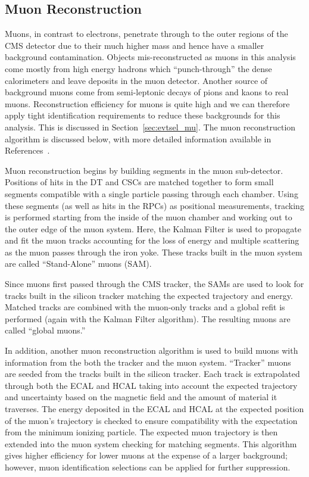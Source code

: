\subsection{Muon Reconstruction}
\label {sec:cms_muon}
Muons, in contrast to electrons, penetrate through to the outer regions of
the CMS detector due to their much higher mass and hence have a smaller
background contamination. Objects mis-reconstructed as muons in this
analysis come mostly from high energy hadrons which ``punch-through'' the
dense calorimeters and leave deposits in the muon detector. Another source
of background muons come from semi-leptonic decays of pions and kaons to
real muons. Reconstruction efficiency for muons is quite high and we can
therefore apply tight identification requirements to reduce these backgrounds
for this analysis. This is discussed in Section~\ref{sec:evtsel_mu}. The muon
reconstruction algorithm is discussed below, with more detailed information
available in References~\cite{muontdr,muonReco}.

Muon reconstruction begins by building segments in the muon sub-detector.
Positions of hits in the DT and CSCs are matched together to form small
segments compatible with a single particle passing through each chamber. Using
these segments (as well as hits in the RPCs) as positional measurements,
tracking is performed starting from the inside of the muon chamber and working
out to the outer edge of the muon system. Here, the Kalman Filter is used
to propagate and fit the muon tracks accounting for the loss of energy and
multiple scattering as the muon passes through the iron yoke. These tracks
built in the muon system are called ``Stand-Alone'' muons (SAM).

Since muons first passed through the CMS tracker, the SAMs are used to look
for tracks built in the silicon tracker matching the expected trajectory and
energy. Matched tracks are combined with the muon-only tracks and a global
refit is performed (again with the Kalman Filter algorithm). The resulting
muons are called ``global muons.''

In addition, another muon reconstruction algorithm is used to build muons
with information from the both the tracker and the muon system. ``Tracker''
muons are seeded from the tracks built in the silicon tracker. Each track is
extrapolated through both the ECAL and HCAL taking into account the expected
trajectory and uncertainty based on the magnetic field and the amount of
material it traverses. The energy deposited in the ECAL and HCAL at the expected
position of the muon's trajectory is checked to ensure compatibility with the
expectation from the minimum ionizing particle. The expected muon trajectory
is then extended into the muon system checking for matching segments. This
algorithm gives higher efficiency for lower \pt muons at the expense of a
larger background; however, muon identification selections can be applied for
further suppression.

